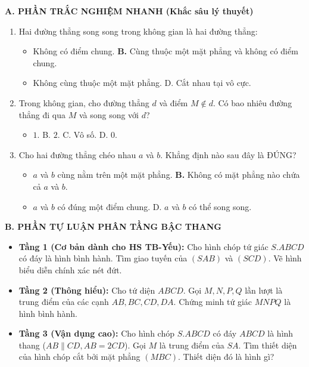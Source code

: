 \documentclass[12pt, a4paper]{article}
\begin{document}
\noindent \textbf{A. PHẦN TRẮC NGHIỆM NHANH (Khắc sâu lý thuyết)}
\begin{enumerate}[leftmargin=0.6cm]
    \item Hai đường thẳng song song trong không gian là hai đường thẳng:
    \begin{itemize}[leftmargin=0.6cm]
        \item[A.] Không có điểm chung. \quad \textbf{B.} Cùng thuộc một mặt phẳng và không có điểm chung.
        \item[C.] Không cùng thuộc một mặt phẳng. \quad D. Cắt nhau tại vô cực.
    \end{itemize}
    \item Trong không gian, cho đường thẳng $d$ và điểm $M \notin d$. Có bao nhiêu đường thẳng đi qua $M$ và song song với $d$?
    \begin{itemize}[leftmargin=0.6cm]
        \item[\textbf{A.}] $1$. \quad B. $2$. \quad C. Vô số. \quad D. $0$.
    \end{itemize}
    \item Cho hai đường thẳng chéo nhau $a$ và $b$. Khẳng định nào sau đây là ĐÚNG?
    \begin{itemize}[leftmargin=0.6cm]
        \item[A.] $a$ và $b$ cùng nằm trên một mặt phẳng. \quad \textbf{B.} Không có mặt phẳng nào chứa cả $a$ và $b$.
        \item[C.] $a$ và $b$ có đúng một điểm chung. \quad D. $a$ và $b$ có thể song song.
    \end{itemize}
\end{enumerate}

\noindent \textbf{B. PHẦN TỰ LUẬN PHÂN TẦNG BẬC THANG}
\begin{itemize}[leftmargin=0.6cm]
    \item \textbf{Tầng 1 (Cơ bản dành cho HS TB-Yếu):} Cho hình chóp tứ giác $S.ABCD$ có đáy là hình bình hành. Tìm giao tuyến của $(SAB)$ và $(SCD)$. Vẽ hình biểu diễn chính xác nét đứt.
    \item \textbf{Tầng 2 (Thông hiểu):} Cho tứ diện $ABCD$. Gọi $M, N, P, Q$ lần lượt là trung điểm của các cạnh $AB, BC, CD, DA$. Chứng minh tứ giác $MNPQ$ là hình bình hành.
    \item \textbf{Tầng 3 (Vận dụng cao):} Cho hình chóp $S.ABCD$ có đáy $ABCD$ là hình thang ($AB \parallel CD, AB = 2CD$). Gọi $M$ là trung điểm của $SA$. Tìm thiết diện của hình chóp cắt bởi mặt phẳng $(MBC)$. Thiết diện đó là hình gì?
\end{itemize}
\end{document}
